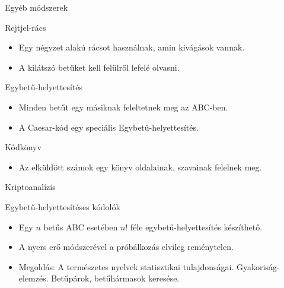 \documentclass[12 pt]{beamer}
\begin{document}

\begin{frame}{Egyéb módszerek}
  \begin{block}{Rejtjel-rács}
    \begin{itemize}
      \item{Egy négyzet alakú rácsot használnak, amin kivágások vannak.}
      \item{A kilátszó betűket kell felülről lefelé olvasni.}
    \end{itemize}
  \end{block}

  \begin{block}{Egybetű-helyettesítés}
    \begin{itemize}
      \item{Minden betűt egy másiknak feleltetnek meg az ABC-ben.}
      \item{A Caesar-kód egy speciális Egybetű-helyettesítés.}
    \end{itemize}
  \end{block}

  \begin{block}{Kódkönyv}
    \begin{itemize}
      \item{Az elküldött számok egy könyv oldalainak, szavainak felelnek meg.}
    \end{itemize}
  \end{block}

\end{frame}


\begin{frame}{Kriptoanalízis}
  \begin{block}{Egybetű-helyettesítéses kódolók}
    \begin{itemize}
      \item{Egy $n$ betűs ABC esetében $n!$ féle egybetű-helyettesítés készíthető.}
      \item{A nyers erő módszerével a próbálkozás elvileg reménytelen.}
      \item{Megoldás: A természetes nyelvek statisztikai tulajdonságai. Gyakoriság-elemzés. Betűpárok, betűhármasok keresése.}
    \end{itemize}
  \end{block}
\end{frame}
\end{document}
